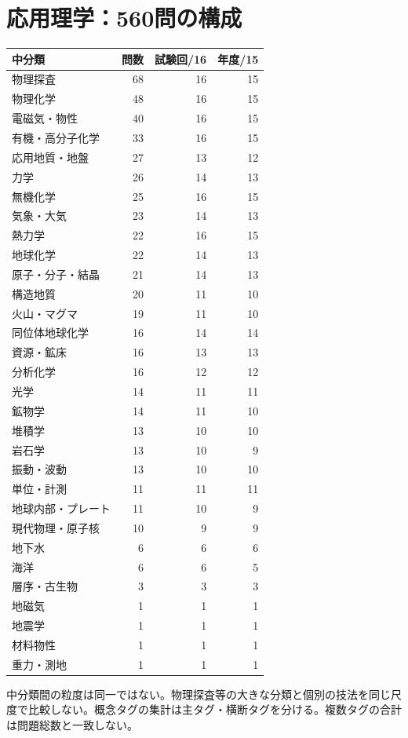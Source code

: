 \section{応用理学：560問の構成}
\begin{longtable}{p{.57\linewidth}rrr}
中分類 & 問数 & 試験回/16 & 年度/15\\\hline
物理探査 & 68 & 16 & 15\\
物理化学 & 48 & 16 & 15\\
電磁気・物性 & 40 & 16 & 15\\
有機・高分子化学 & 33 & 16 & 15\\
応用地質・地盤 & 27 & 13 & 12\\
力学 & 26 & 14 & 13\\
無機化学 & 25 & 16 & 15\\
気象・大気 & 23 & 14 & 13\\
熱力学 & 22 & 16 & 15\\
地球化学 & 22 & 14 & 13\\
原子・分子・結晶 & 21 & 14 & 13\\
構造地質 & 20 & 11 & 10\\
火山・マグマ & 19 & 11 & 10\\
同位体地球化学 & 16 & 14 & 14\\
資源・鉱床 & 16 & 13 & 13\\
分析化学 & 16 & 12 & 12\\
光学 & 14 & 11 & 11\\
鉱物学 & 14 & 11 & 10\\
堆積学 & 13 & 10 & 10\\
岩石学 & 13 & 10 & 9\\
振動・波動 & 13 & 10 & 10\\
単位・計測 & 11 & 11 & 11\\
地球内部・プレート & 11 & 10 & 9\\
現代物理・原子核 & 10 & 9 & 9\\
地下水 & 6 & 6 & 6\\
海洋 & 6 & 6 & 5\\
層序・古生物 & 3 & 3 & 3\\
地磁気 & 1 & 1 & 1\\
地震学 & 1 & 1 & 1\\
材料物性 & 1 & 1 & 1\\
重力・測地 & 1 & 1 & 1\\
\end{longtable}
中分類間の粒度は同一ではない。物理探査等の大きな分類と個別の技法を同じ尺度で比較しない。概念タグの集計は主タグ・横断タグを分ける。複数タグの合計は問題総数と一致しない。
